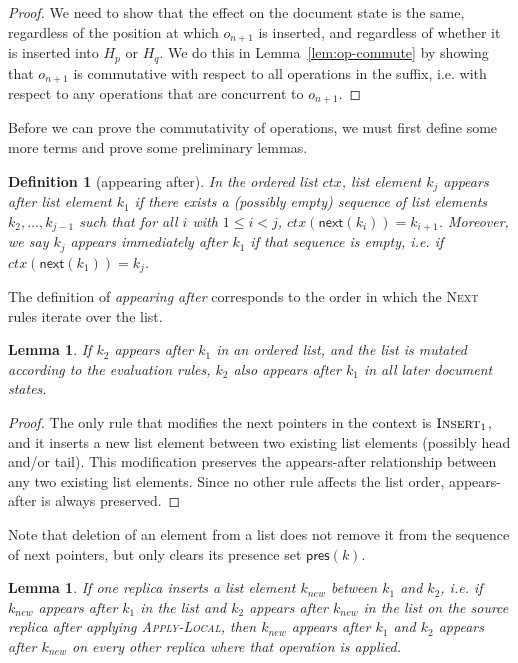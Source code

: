 \documentclass[10pt,journal,compsoc]{IEEEtran}
\newtheorem{definition}{Definition}
\newtheorem{lemma}[theorem]{Lemma}
\begin{document}
\begin{proof}
We need to show that the effect on the document state is the same, regardless of the position at which $o_{n+1}$ is inserted, and regardless of whether it is inserted into $H_p$ or $H_q$. We do this in Lemma~\ref{lem:op-commute} by showing that $o_{n+1}$ is commutative with respect to all operations in the suffix, i.e. with respect to any operations that are concurrent to $o_{n+1}$.
\end{proof}

Before we can prove the commutativity of operations, we must first define some more terms and prove some preliminary lemmas.

\begin{definition}[appearing after]
In the ordered list $\mathit{ctx}$, list element $k_j$ \emph{appears after} list element $k_1$ if there exists a (possibly empty) sequence of list elements $k_2, \dots, k_{j-1}$ such that for all $i$ with $1 \le i < j$, $\mathit{ctx}(\mathsf{next}(k_i)) = k_{i+1}$. Moreover, we say $k_j$ appears \emph{immediately after} $k_1$ if that sequence is empty, i.e. if $\mathit{ctx}(\mathsf{next}(k_1)) = k_j$.
\end{definition}

The definition of \emph{appearing after} corresponds to the order in which the \textsc{Next} rules iterate over the list.

\begin{lemma}\label{lem:list-after}
If $k_2$ appears after $k_1$ in an ordered list, and the list is mutated according to the evaluation rules, $k_2$ also appears after $k_1$ in all later document states.
\end{lemma}

\begin{proof}
The only rule that modifies the \textsf{next} pointers in the context is $\textsc{Insert}_1$, and it inserts a new list element between two existing list elements (possibly \textsf{head} and/or \textsf{tail}). This modification preserves the appears-after relationship between any two existing list elements. Since no other rule affects the list order, appears-after is always preserved.
\end{proof}

Note that deletion of an element from a list does not remove it from the sequence of \textsf{next} pointers, but only clears its presence set $\mathsf{pres}(k)$.

\begin{lemma}\label{lem:insert-between}
If one replica inserts a list element $k_\mathit{new}$ between $k_1$ and $k_2$, i.e. if $k_\mathit{new}$ appears after $k_1$ in the list and $k_2$ appears after $k_\mathit{new}$ in the list on the source replica after applying \textsc{Apply-Local}, then $k_\mathit{new}$ appears after $k_1$ and $k_2$ appears after $k_\mathit{new}$ on every other replica where that operation is applied.
\end{lemma}
\end{document}
